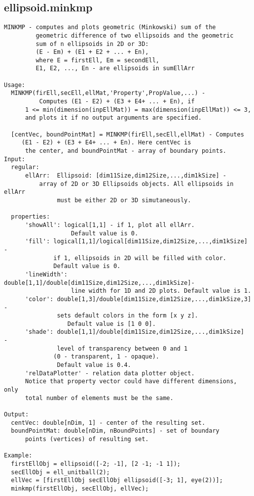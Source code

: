 \subsection{\texorpdfstring{ellipsoid.minkmp}{minkmp}}\label{method:ellipsoid.minkmp}
\begin{verbatim}
MINKMP - computes and plots geometric (Minkowski) sum of the
         geometric difference of two ellipsoids and the geometric
         sum of n ellipsoids in 2D or 3D:
         (E - Em) + (E1 + E2 + ... + En),
         where E = firstEll, Em = secondEll,
         E1, E2, ..., En - are ellipsoids in sumEllArr

Usage:
  MINKMP(firEll,secEll,ellMat,'Property',PropValue,...) -
          Computes (E1 - E2) + (E3 + E4+ ... + En), if
      1 <= min(dimension(inpEllMat)) = max(dimension(inpEllMat)) <= 3,
      and plots it if no output arguments are specified.

  [centVec, boundPointMat] = MINKMP(firEll,secEll,ellMat) - Computes
     (E1 - E2) + (E3 + E4+ ... + En). Here centVec is
      the center, and boundPointMat - array of boundary points.
Input:
  regular:
      ellArr:  Ellipsoid: [dim11Size,dim12Size,...,dim1kSize] -
          array of 2D or 3D Ellipsoids objects. All ellipsoids in ellArr
               must be either 2D or 3D simutaneously.

  properties:
      'showAll': logical[1,1] - if 1, plot all ellArr.
                   Default value is 0.
      'fill': logical[1,1]/logical[dim11Size,dim12Size,...,dim1kSize]  -
              if 1, ellipsoids in 2D will be filled with color.
              Default value is 0.
      'lineWidth': double[1,1]/double[dim11Size,dim12Size,...,dim1kSize]-
                   line width for 1D and 2D plots. Default value is 1.
      'color': double[1,3]/double[dim11Size,dim12Size,...,dim1kSize,3] -
               sets default colors in the form [x y z].
                  Default value is [1 0 0].
      'shade': double[1,1]/double[dim11Size,dim12Size,...,dim1kSize]  -
               level of transparency between 0 and 1
              (0 - transparent, 1 - opaque).
               Default value is 0.4.
      'relDataPlotter' - relation data plotter object.
      Notice that property vector could have different dimensions, only
      total number of elements must be the same.

Output:
  centVec: double[nDim, 1] - center of the resulting set.
  boundPointMat: double[nDim, nBoundPoints] - set of boundary
      points (vertices) of resulting set.

Example:
  firstEllObj = ellipsoid([-2; -1], [2 -1; -1 1]);
  secEllObj = ell_unitball(2);
  ellVec = [firstEllObj secEllObj ellipsoid([-3; 1], eye(2))];
  minkmp(firstEllObj, secEllObj, ellVec);
\end{verbatim}
